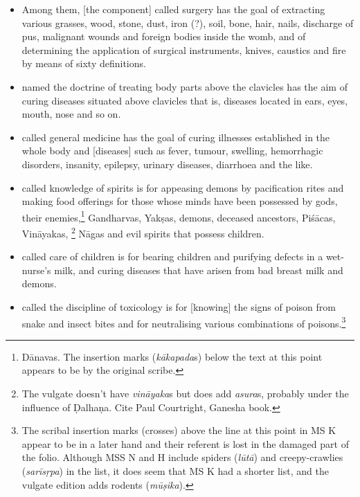 \documentclass[12pt]{article}
\newcommand{\saneng}[2]{#2 (\emph{#1})}
\begin{document}
\begin{itemize}
        \item[8.1b] Among them, [the component] called surgery has the goal of extracting various grasses, wood, stone, dust, iron (?), soil, bone, hair, nails, discharge of pus, malignant wounds and foreign bodies inside the womb, and of determining the application of surgical instruments, knives, caustics and fire by means of sixty definitions.
        
        \item[8.2] [The component] named the doctrine of treating body parts above 
        the clavicles has the aim of curing diseases situated above clavicles that is,  
        diseases located in ears, eyes, mouth, nose and so on.
        
        \item[8.3] [The component] called general medicine has the goal of curing illnesses established in the whole body and [diseases] such as fever, tumour, swelling, hemorrhagic disorders, insanity, epilepsy, urinary diseases, diarrhoea and the like.
        
        \item[8.4] [The component] called knowledge of spirits is for appeasing
demons by pacification rites and making food offerings for those whose
minds have been possessed by gods, their enemies,\footnote{Dānavas.  The
insertion marks (\emph{kākapada}s) below the text at this point appears to
be by the original scribe.} Gandharvas, Yakṣas, demons, deceased
ancestors, Piśācas, Vināyakas, \footnote{The vulgate doesn't have
\emph{vināyaka}s but does add \emph{asura}s, probably under the influence
of Ḍalhaṇa.  Cite Paul Courtright, Ganesha book.} Nāgas and evil spirits
that possess children. %
        
        
        
        \item[8.5] [The component] called care of children is for bearing children and purifying defects in a wet-nurse's milk, and curing diseases that have arisen from bad breast milk and demons.
        
        \item[8.6] [The component] called the discipline of toxicology is for
[knowing] the signs of poison from snake and insect bites and for
neutralising various combinations of poisons.\footnote{The scribal
insertion marks (crosses) above the line at this point in MS K appear to
be in a later hand and their referent is lost in the damaged part of the
folio.  Although MSS N and H include \saneng{lūtā}{spiders} and
\saneng{sarīsṛpa}{creepy-crawlies} in the list, it does seem that MS K had
a shorter list, and the vulgate edition adds \saneng{mūṣika}{rodents}.}
        

\end{itemize}
\end{document}

